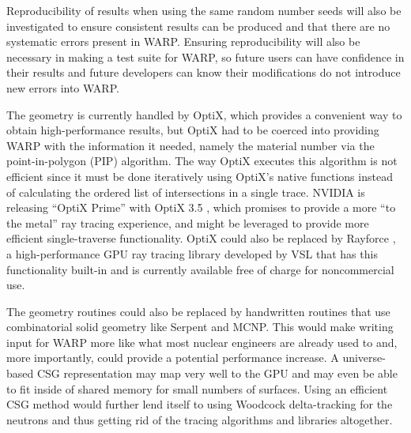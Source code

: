 \documentclass[preprint,12pt]{elsarticle}
\begin{document}
Reproducibility of results when using the same random number seeds will also be investigated to ensure consistent results can be produced and that there are no systematic errors present in WARP.  Ensuring reproducibility will also be necessary in making a test suite for WARP, so future users can have confidence in their results and future developers can know their modifications do not introduce new errors into WARP.

The geometry is currently handled by OptiX, which provides a convenient way to obtain high-performance results, but OptiX had to be coerced into providing WARP with the information it needed, namely the material number via the point-in-polygon (PIP) algorithm.  The way OptiX executes this algorithm is not efficient since it must be done iteratively using OptiX's native functions instead of calculating the ordered list of intersections in a single trace.  NVIDIA is releasing ``OptiX Prime'' with OptiX 3.5 \cite{optix3.5}, which promises to provide a more ``to the metal'' ray tracing experience, and might be leveraged to provide more efficient single-traverse functionality.  OptiX could also be replaced by Rayforce \cite{rayforce}, a high-performance GPU ray tracing library developed by VSL that has this functionality built-in and is currently available free of charge for noncommercial use.


The geometry routines could also be replaced by handwritten routines that use combinatorial solid geometry like Serpent and MCNP.  This would make writing input for WARP more like what most nuclear engineers are already used to and, more importantly, could provide a potential performance increase.  A universe-based CSG representation may map very well to the GPU and may even be able to fit inside of shared memory for small numbers of surfaces.  Using an efficient CSG method would further lend itself to using Woodcock delta-tracking for the neutrons and thus getting rid of the tracing algorithms and libraries altogether.   
\end{document}
